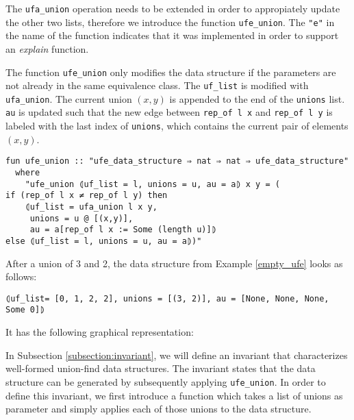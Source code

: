 The \lstinline{ufa_union} operation needs to be extended in order to appropiately update the other two lists, therefore we introduce the function \lstinline{ufe_union}. The \lstinline|"e"| in the name of the function indicates that it was implemented in order to support an \emph{explain} function.

The function \lstinline{ufe_union} only modifies the data structure if the parameters are not already in the same equivalence class.
The \lstinline{uf_list} is modified with \lstinline{ufa_union}.
The current union $(x, y)$ is appended to the end of the \lstinline{unions} list.
\lstinline{au} is updated such that the new edge between \lstinline{rep_of l x} and \lstinline{rep_of l y} is labeled with the last index of \lstinline{unions}, which contains the current pair of elements $(x, y)$.

\begin{lstlisting}
fun ufe_union :: "ufe_data_structure ⇒ nat ⇒ nat ⇒ ufe_data_structure"
  where
    "ufe_union ⦇uf_list = l, unions = u, au = a⦈ x y = (
if (rep_of l x ≠ rep_of l y) then
    ⦇uf_list = ufa_union l x y,
     unions = u @ [(x,y)],
     au = a[rep_of l x := Some (length u)]⦈
else ⦇uf_list = l, unions = u, au = a⦈)"
\end{lstlisting}

\begin{exmp}
After a union of 3 and 2, the data structure from Example \ref{empty_ufe} looks as follows:
\begin{lstlisting}
⦇uf_list= [0, 1, 2, 2], unions = [(3, 2)], au = [None, None, None, Some 0]⦈
\end{lstlisting}
It has the following graphical representation:
\begin{center}
\end{center}

\end{exmp}

In Subsection \ref{subsection:invariant}, we will define an invariant that characterizes well-formed union-find data structures.
The invariant states that the data structure can be generated by subsequently applying \lstinline|ufe_union|.
In order to define this invariant, we first introduce a function which takes a list of unions as parameter and simply applies each of those unions to the data structure.



